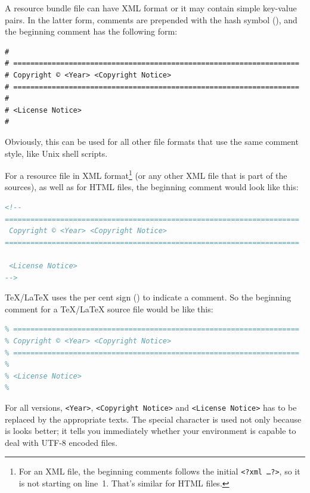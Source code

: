 A resource bundle file \autocite{ORACLE_DOC_RESOURCEBUNDLE_CLASS} can have XML format or it may contain simple key-value pairs. In the latter form, comments are prepended with the hash symbol (\bdq{\texttt{\#}}), and the beginning comment has the following form: 

\begin{lstlisting}[language={},caption={Beginning Comment for a Resource or a Script file}]
#
# ===================================================================
# Copyright © <Year> <Copyright Notice>
# ===================================================================
#
# <License Notice>
#
\end{lstlisting}

Obviously, this can be used for all other file formats that use the same comment style, like Unix shell scripts.

For a resource file in XML format\footnote{For an XML file, the beginning comments follows the initial \lstinline|<?xml …?>|, so it is not starting on line~1. That's similar for HTML files.} (or any other XML file that is part of the sources), as well as for HTML files, the beginning comment would look like this:

\begin{lstlisting}[firstnumber=5,language=XML,caption={Beginning Comment for XML and HTML files}]
<!--
=====================================================================
 Copyright © <Year> <Copyright Notice>
=====================================================================

 <License Notice>
-->
\end{lstlisting}

\TeX/\LaTeX{} uses the per cent sign (\bdq{\texttt{\%}}) to indicate a comment. So the beginning comment for a \TeX/\LaTeX{} source file would be like this:

\begin{lstlisting}[language={TeX},caption={Beginning Comment for a \TeX/\LaTeX\ file}]
%
% ===================================================================
% Copyright © <Year> <Copyright Notice>
% ===================================================================
%
% <License Notice>
%
\end{lstlisting}

For all versions, \texttt{<Year>}, \texttt{<Copyright Notice>} and \texttt{<License Notice>} has to be replaced by the appropriate texts. The special character \bdq{\copyright} is used not only because is looks better; it tells you immediately whether your environment is capable to deal with UTF-8 encoded files.

